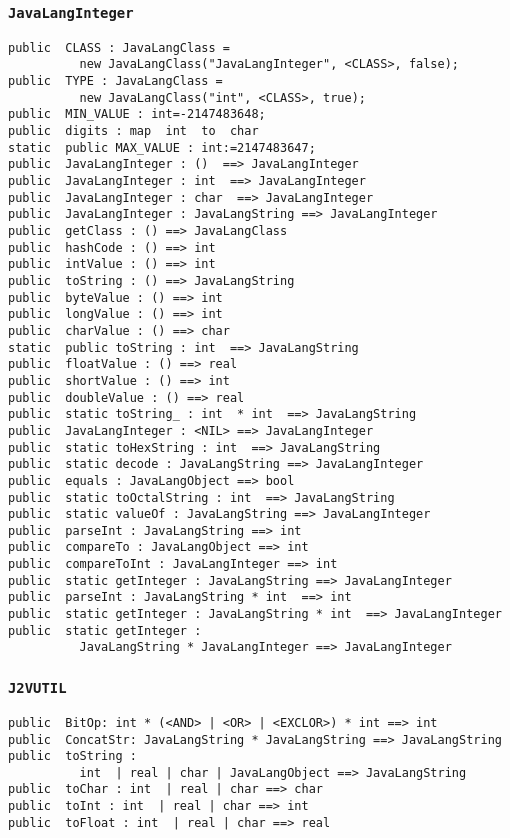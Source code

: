 \documentclass[\pformat,12pt]{article}
\begin{document}
\subsubsection{\texttt{JavaLangInteger}}
\begin{small}
\begin{verbatim}
public  CLASS : JavaLangClass = 
          new JavaLangClass("JavaLangInteger", <CLASS>, false);
public  TYPE : JavaLangClass =
          new JavaLangClass("int", <CLASS>, true);
public  MIN_VALUE : int=-2147483648;
public  digits : map  int  to  char
static  public MAX_VALUE : int:=2147483647;
public  JavaLangInteger : ()  ==> JavaLangInteger
public  JavaLangInteger : int  ==> JavaLangInteger
public  JavaLangInteger : char  ==> JavaLangInteger
public  JavaLangInteger : JavaLangString ==> JavaLangInteger
public  getClass : () ==> JavaLangClass
public  hashCode : () ==> int
public  intValue : () ==> int
public  toString : () ==> JavaLangString
public  byteValue : () ==> int
public  longValue : () ==> int
public  charValue : () ==> char
static  public toString : int  ==> JavaLangString
public  floatValue : () ==> real
public  shortValue : () ==> int
public  doubleValue : () ==> real
public  static toString_ : int  * int  ==> JavaLangString
public  JavaLangInteger : <NIL> ==> JavaLangInteger
public  static toHexString : int  ==> JavaLangString
public  static decode : JavaLangString ==> JavaLangInteger
public  equals : JavaLangObject ==> bool
public  static toOctalString : int  ==> JavaLangString
public  static valueOf : JavaLangString ==> JavaLangInteger
public  parseInt : JavaLangString ==> int
public  compareTo : JavaLangObject ==> int
public  compareToInt : JavaLangInteger ==> int
public  static getInteger : JavaLangString ==> JavaLangInteger
public  parseInt : JavaLangString * int  ==> int
public  static getInteger : JavaLangString * int  ==> JavaLangInteger
public  static getInteger : 
          JavaLangString * JavaLangInteger ==> JavaLangInteger
\end{verbatim}
\end{small}

\subsubsection{\texttt{J2VUTIL}}
\begin{small}
\begin{verbatim}
public  BitOp: int * (<AND> | <OR> | <EXCLOR>) * int ==> int
public  ConcatStr: JavaLangString * JavaLangString ==> JavaLangString
public  toString : 
          int  | real | char | JavaLangObject ==> JavaLangString
public  toChar : int  | real | char ==> char
public  toInt : int  | real | char ==> int
public  toFloat : int  | real | char ==> real
\end{verbatim}
\end{small}
\end{document}
